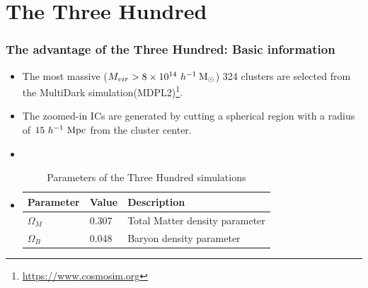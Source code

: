 \documentclass[aspectratio=43]{beamer}
\newcommand{\hMsun}{~h^{-1}\>{\rm M_\odot}}
\newcommand{\Mpc}{~h^{-1}~{\rm Mpc}}
\begin{document}
\section{The Three Hundred}
\begin{frame}
  \frametitle{The advantage of the Three Hundred: Basic information}
  \begin{itemize}
    \item<1-> {The most massive ($M_{vir} > 8\times 10^{14} \hMsun$) \alert{324} clusters are selected from the MultiDark simulation(MDPL2)\footnote{\url{https://www.cosmosim.org}}.}
    \item<1-> {The zoomed-in ICs are generated by cutting a spherical region with a radius of \alert{$15 \Mpc$} from the cluster center.}
    \item<2|only@2>[]{
      \begin{center}
    \end{center}}
    \item<3|only@3>[]{
      \begin{table}
        \fontsize{10}{10}\selectfont
        \caption{Parameters of the Three Hundred simulations}
        \begin{tabular}{lll}
          \hline
          Parameter& Value & Description\\
          \hline
          $\Omega_M$ & 0.307 & Total Matter density parameter\\
          $\Omega_B$ & 0.048 & Baryon density parameter\\

\end{tabular}
\end{table}}
\end{itemize}
\end{frame}
\end{document}
